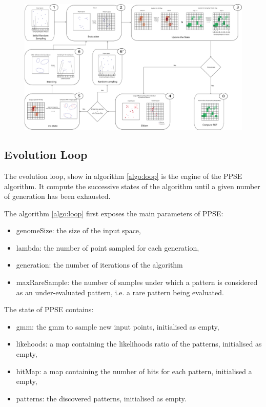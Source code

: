 \documentclass[10pt,letterpaper]{article}
\theoremstyle{definition}
\theoremstyle{remark}
\begin{document}
\begin{figure}
 \centering
  \includegraphics[width=\linewidth]{images/schemaalgo.pdf}%
\end{figure}


\subsection*{Evolution Loop}

The evolution loop, show in algorithm \ref{algo:loop} is the engine of the PPSE algorithm. It compute the successive states of the algorithm until a given number of generation has been exhausted.

The algorithm \ref{algo:loop} first exposes the main parameters of PPSE:
\begin{itemize}
    \item genomeSize: the size of the input space,
    \item lambda: the number of point sampled for each generation,
    \item generation: the number of iterations of the algorithm
    \item maxRareSample: the number of samples under which a pattern is considered as an under-evaluated pattern, i.e. a rare pattern being evaluated.
\end{itemize}

The state of PPSE contains:
\begin{itemize}
    \item gmm: the gmm to sample new input points, initialised as empty,
    \item likehoods: a map containing the likelihoods ratio of the patterns, initialised as empty,
    \item hitMap: a map containing the number of hits for each pattern, initialised a empty,
    \item patterns: the discovered patterns, initialised as empty.
\end{itemize}
\end{document}
